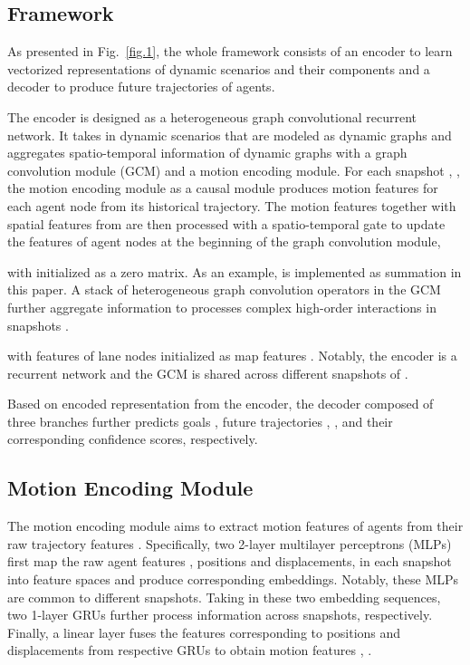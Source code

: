 \documentclass[letterpaper, 10 pt, conference]{ieeeconf}
\begin{document}
\subsection{Framework}
As presented in Fig.~\ref{fig.1}, the whole framework consists of an encoder to learn vectorized representations of dynamic scenarios and their components  and a decoder to produce future trajectories of agents.

The encoder is designed as a  heterogeneous graph convolutional recurrent network. It takes in dynamic scenarios that are modeled as dynamic graphs and aggregates spatio-temporal information of dynamic graphs with a graph convolution module (GCM) and a motion encoding module.  For each snapshot , , the motion encoding module as a causal module produces motion features   for each agent node  from its  historical trajectory. The motion features  together with  spatial features  from  are then processed with a spatio-temporal gate  to update the features of agent nodes at the beginning of the graph convolution module,

with  initialized as a zero matrix. As an example,  is implemented as summation in this paper.  A stack of heterogeneous graph convolution operators in the GCM further aggregate information to processes complex high-order interactions in  snapshots .

with features of lane nodes initialized as map features . Notably, the encoder is a recurrent network and the GCM is shared across different snapshots  of .

Based on encoded representation  from the encoder,  the decoder  composed of three branches further predicts  goals , future trajectories , , and their corresponding confidence scores, respectively.

\subsection{Motion Encoding Module}
The motion encoding module aims to extract motion features of agents from their raw trajectory features . Specifically, two 2-layer multilayer perceptrons (MLPs) first map the raw agent features ,  positions and displacements, in each snapshot   into feature spaces and produce corresponding embeddings. Notably, these MLPs are common to different snapshots. Taking in these two embedding sequences, two 1-layer GRUs further process information across snapshots, respectively.  Finally, a linear layer fuses the features corresponding to positions and displacements from respective GRUs to obtain motion features , .
\end{document}
